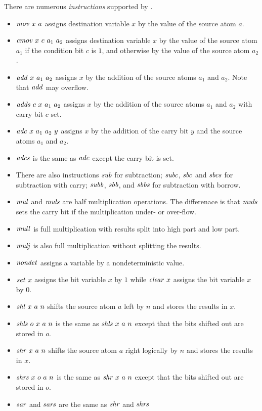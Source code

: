 \documentclass{article}
\begin{document}
There are numerous \emph{instructions} supported by \cryptoline.
\begin{itemize}
\item $\mathit{mov}\ x\ a$ assigns destination variable $x$ by the value of
  the source atom $a$.
\item $\mathit{cmov}\ x\ c\ a_1\ a_2$ assigns destination variable $x$ by the
  value of the source atom $a_1$ if the condition bit $c$ is $1$, and
  otherwise by the value of the source atom $a_2$.
\item $\mathit{add}\ x\ a_1\ a_2$ assigns $x$ by the addition of the source
  atoms $a_1$ and $a_2$.
  Note that $\mathit{add}$ may overflow.
\item $\mathit{adds}\ c\ x\ a_1\ a_2$ assigns $x$ by the addition of the
  source atoms $a_1$ and $a_2$ with carry bit $c$ set.
\item $\mathit{adc}\ x\ a_1\ a_2\ y$ assigns $x$ by the addition of the carry
  bit $y$ and the source atoms $a_1$ and $a_2$.
\item $\mathit{adcs}$ is the same as $\mathit{adc}$ except the carry bit is set.
\item There are also instructions $\mathit{sub}$ for subtraction; $\mathit{subc}$,
  $\mathit{sbc}$ and $\mathit{sbcs}$ for subtraction with carry; $\mathit{subb}$, $\mathit{sbb}$,
  and $\mathit{sbbs}$ for subtraction with borrow.
\item $\mathit{mul}$ and $\mathit{muls}$ are half multiplication operations.
  The differenace is that $\mathit{muls}$ sets the carry bit if the
  multiplication under- or over-flow.
\item $\mathit{mull}$ is full multiplication with results split into high
  part and low part.
\item $\mathit{mulj}$ is also full multiplication without splitting the
  results.
\item $\mathit{nondet}$ assigns a variable by a nondeterministic value.
\item $\mathit{set}\ x$ assigns the bit variable $x$ by $1$ while $\mathit{clear}\
  x$ assigns the bit variable $x$ by $0$.
\item $\mathit{shl}\ x\ a\ n$ shifts the source atom $a$ left by $n$ and
  stores the results in $x$.
\item $\mathit{shls}\ o\ x\ a\ n$ is the same as $\mathit{shls}\ x\ a\ n$ except
  that the bits shifted out are stored in $o$.
\item $\mathit{shr}\ x\ a\ n$ shifts the source atom $a$ right logically by
  $n$ and stores the results in $x$.
\item $\mathit{shrs}\ x\ o\ a\ n$ is the same as $\mathit{shr}\ x\ a\ n$ except that
  the bits shifted out are stored in $o$.
\item $\mathit{sar}$ and $\mathit{sars}$ are the same as $\mathit{shr}$ and $\mathit{shrs}$

\end{itemize}
\end{document}
